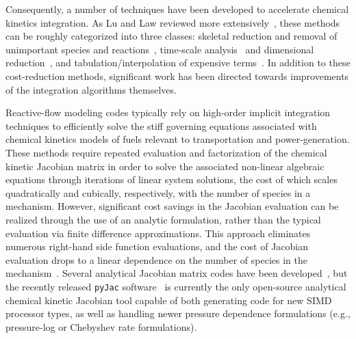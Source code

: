 \documentclass[preprint,12pt]{elsarticle}
\begin{document}
Consequently, a number of techniques have been developed to accelerate chemical kinetics integration.
As Lu and Law reviewed more extensively~\cite{Lu:2009gh}, these methods can be roughly categorized into three classes: skeletal reduction and removal of unimportant species and reactions~\cite{vajda_pca,rabitz_sa,turanyi_sa_1,turanyi_sa_2,Lu:2005,Lu:2006bb,valorani_csp,valorani_csp2,Lu:2008bi,Pepiot-Desjardins:2008,Niemeyer:2010bt,Niemeyer:2014,Curtis:2015aa}, time-scale analysis~\cite{qssa,pe_approx1,pe_approx2} and dimensional reduction~\cite{Lam:1988wc,Maas:1992aa,Lam:1993ub,Lam:1994ws,Lu:2001ve}, and tabulation\slash interpolation of expensive terms~\cite{Pope:1997wu,Christo1996,Tonse:1999aa}.
In addition to these cost-reduction methods, significant work has been directed towards improvements of the integration algorithms themselves.

Reactive-flow modeling codes typically rely on high-order implicit integration techniques to efficiently solve the stiff governing equations associated with chemical kinetics models of fuels relevant to transportation and power-generation.
These methods require repeated evaluation and factorization of the chemical kinetic Jacobian matrix in order to solve the associated non-linear algebraic equations through iterations of linear system solutions, the cost of which scales quadratically and cubically, respectively, with the number of species in a mechanism.
However, significant cost savings in the Jacobian evaluation can be realized through the use of an analytic formulation, rather than the typical evaluation via finite difference approximations.
This approach eliminates numerous right-hand side function evaluations, and the cost of Jacobian evaluation drops to a linear dependence on the number of species in the mechanism~\cite{Lu:2009gh}.
Several analytical Jacobian matrix codes have been developed~\cite{Safta:2011vn,Youssefi:2011tm,Bisetti:2012jw,Perini:2012gy,Dijkmans:2014bb}, but the recently released \texttt{pyJac} software~\cite{Niemeyer:2015im,Niemeyer:2015ws} is currently the only open-source analytical chemical kinetic Jacobian tool capable of both generating code for new SIMD processor types, as well as handling newer pressure dependence formulations (e.g., pressure-log or Chebyshev rate formulations).
\end{document}
